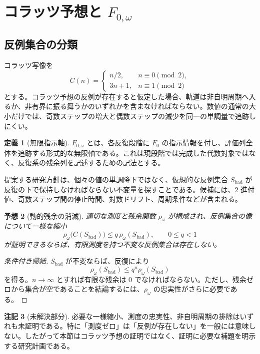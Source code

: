 \documentclass[a4paper,11pt]{ltjsarticle}
\theoremstyle{definition}
\newtheorem{definition}{定義}[section]
\newtheorem{remark}[definition]{注記}
\theoremstyle{plain}
\newtheorem{conjecture}[definition]{予想}
\newcommand{\Fzero}{F_{0}}
\newcommand{\Fomega}{F_{0,\omega}}
\begin{document}
\section{コラッツ予想と \texorpdfstring{$F_{0,\omega}$}{F0-omega}}

\subsection{反例集合の分類}

コラッツ写像を
\[
 C(n)=
 \begin{cases}
 n/2,&n\equiv0\pmod 2,\\
 3n+1,&n\equiv1\pmod 2
 \end{cases}
\]
とする。コラッツ予想の反例が存在すると仮定した場合、軌道は非自明周期へ入るか、非有界に振る舞うかのいずれかを含まなければならない。数値の通常の大小だけでは、奇数ステップの増大と偶数ステップの減少を同一の単調量で追跡しにくい。

\begin{definition}[無限指示軸]
$\Fomega$ とは、各反復段階に $\Fzero$ の指示情報を付し、評価列全体を追跡する形式的な無限軸である。これは現段階では完成した代数対象ではなく、反復系の残余列を記述するための記法とする。
\end{definition}

提案する研究方針は、個々の値の単調降下ではなく、仮想的な反例集合 $S_{\mathrm{bad}}$ が反復の下で保持しなければならない不変量を探すことである。候補には、$2$ 進付値、奇数ステップ間の停止時間、対数ドリフト、周期条件などが含まれる。

\begin{conjecture}[動的残余の消滅]
適切な測度と残余関数 $\rho_{\omega}$ が構成され、反例集合の像について一様な縮小
\[
 \rho_{\omega}\bigl(C(S_{\mathrm{bad}})\bigr)
 \leq q\,\rho_{\omega}(S_{\mathrm{bad}}),
 \qquad 0\leq q<1
\]
が証明できるならば、有限測度を持つ不変な反例集合は存在しない。
\end{conjecture}

\begin{proof}[条件付き帰結]
$S_{\mathrm{bad}}$ が不変ならば、反復により
\[
 \rho_{\omega}(S_{\mathrm{bad}})
 \leq q^n\rho_{\omega}(S_{\mathrm{bad}})
\]
を得る。$n\to\infty$ とすれば有限な残余は $0$ でなければならない。ただし、残余ゼロから集合が空であることを結論するには、$\rho_{\omega}$ の忠実性がさらに必要である。
\end{proof}

\begin{remark}[未解決部分]
必要な一様縮小、測度の忠実性、非自明周期の排除はいずれも未証明である。特に「測度ゼロ」は「反例が存在しない」を一般には意味しない。したがって本節はコラッツ予想の証明ではなく、証明に必要な補題を明示する研究計画である。
\end{remark}
\end{document}
